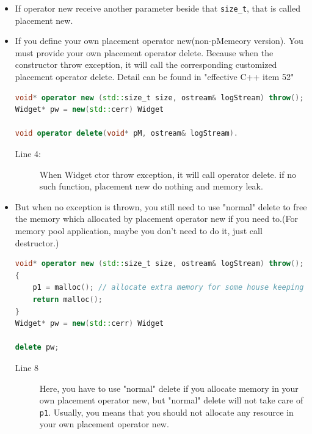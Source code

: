 \documentclass[a4paper,11pt,twoside]{book}
\begin{document}
\begin{itemize}
	
	\item If operator new receive another parameter beside that \texttt{size\_t}, that is called placement new.
	
	\item If you define your own placement operator new(non-pMemeory version). You must provide your own placement operator delete. Because when the constructor throw exception, it will call the corresponding customized placement operator delete. Detail can be found in "effective C++ item 52"
\begin{lstlisting}[frame=single, language=c++]
void* operator new (std::size_t size, ostream& logStream) throw();
Widget* pw = new(std::cerr) Widget
	
void operator delete(void* pM, ostream& logStream). 
\end{lstlisting}
\begin{description}
	\item[Line 4:] When Widget ctor throw exception, it will call operator delete. if no such function, placement new do nothing and memory leak.
\end{description}

		\item But when no exception is thrown,  you still need to use "normal" delete to free the memory which allocated by placement operator new if you need to.(For memory pool application, maybe you don't need to do it, just call destructor.)

\begin{lstlisting}[frame=single, language=c++]
void* operator new (std::size_t size, ostream& logStream) throw();
{
	p1 = malloc(); // allocate extra memory for some house keeping work.
	return malloc();
}
Widget* pw = new(std::cerr) Widget
	
delete pw;
\end{lstlisting}		
\begin{description}
	\item[Line 8] Here, you have to use "normal" delete if you allocate memory in your own placement operator new, but "normal" delete will not take care of \texttt{p1}. Usually, you means that you should not allocate any resource in your own placement operator new.
\end{description}


\end{itemize}
\end{document}
